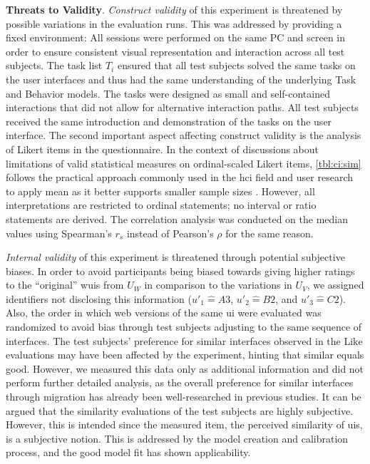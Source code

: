 \textbf{Threats to Validity}. \emph{Construct validity} of this experiment is threatened by possible variations in the evaluation runs.
This was addressed by providing a fixed environment: All sessions were performed on the same PC and screen in order to ensure consistent visual representation and interaction across all test subjects.
The task list \(T_i\) ensured that all test subjects solved the same tasks on the user interfaces and thus had the same understanding of the underlying Task and Behavior models.
The tasks were designed as small and self-contained interactions that did not allow for alternative interaction paths.
All test subjects received the same introduction and demonstration of the tasks on the  user interface.
The second important aspect affecting construct validity is the analysis of Likert items in the questionnaire.
In the context of discussions about limitations of valid statistical measures on ordinal-scaled Likert items, \cref{tbl:ci:sim} follows the practical approach commonly used in the \gls{hci} field and user research to apply mean as it better supports smaller sample sizes \autocite{Sauro2016}.
However, all interpretations are restricted to ordinal statements; no interval or ratio statements are derived.
The correlation analysis was conducted on the median values using Spearman's \(r_s\) instead of Pearson's \(\rho\) for the same reason.

\emph{Internal validity} of this experiment is threatened through potential subjective biases.
In order to avoid participants being biased towards giving higher ratings to the ``original'' \glspl{wui} from \(U_W\) in comparison to the variations in \(U_V\), we assigned identifiers not disclosing this information (\(u'_1 \widehat{=} A3\), \(u'_2\widehat{=} B2\), and \(u'_3\widehat{=} C2\)).
Also, the order in which \gls{web} versions of the same  \gls{ui} were evaluated was randomized to avoid bias through test subjects adjusting to the same sequence of interfaces.
The test subjects' preference for similar interfaces observed in the \(\text{Like}\) evaluations may have been affected by the experiment, hinting that similar equals good.
However, we measured this data only as additional information and did not perform further detailed analysis, as the overall preference for similar interfaces through migration has already been well-researched in previous studies.
It can be argued that the similarity evaluations of the test subjects are highly subjective.
However, this is intended since the measured item, the perceived similarity of \glspl{ui}, is a subjective notion.
This is addressed by the model creation and calibration process, and the good model fit has shown applicability.

